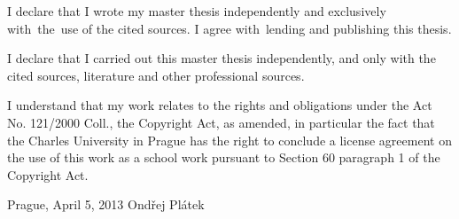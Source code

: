 \vspace{\fill} %
\noindent
I declare that I wrote my master thesis independently and exclusively with~the~use of the cited sources. I agree with~lending and publishing this thesis.


\medskip\noindent
I declare that I carried out this master thesis independently, and only with the cited
sources, literature and other professional sources.

I understand that my work relates to the rights and obligations under the Act No.
121/2000 Coll., the Copyright Act, as amended, in particular the fact that the Charles
University in Prague has the right to conclude a license agreement on the use of this
work as a school work pursuant to Section 60 paragraph 1 of the Copyright Act.

\noindent Prague, April 5, 2013 \hspace{\fill}Ondřej Plátek 


%

\newpage

